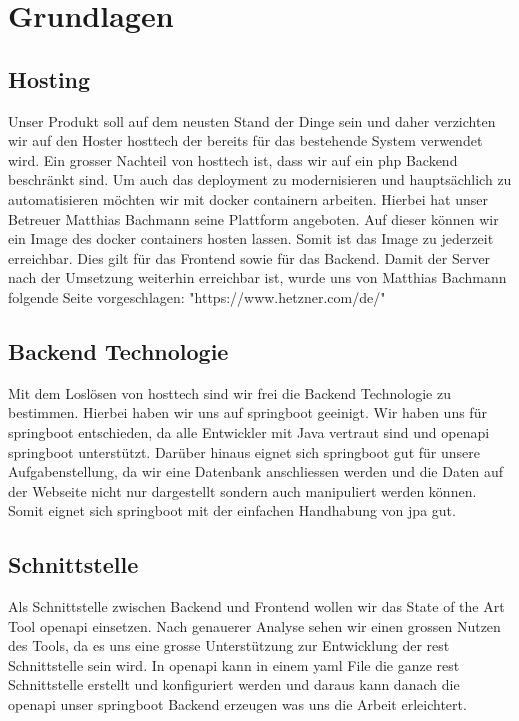 \documentclass[../main.tex]{subfiles}
\begin{document}
	\section{Grundlagen}
	
	\subsection{Hosting}
	Unser Produkt soll auf dem neusten Stand der Dinge sein und daher verzichten wir auf den Hoster \gls{hosttech} der bereits für das bestehende System verwendet wird. Ein grosser Nachteil von \gls{hosttech} ist, dass wir auf ein \gls{php} Backend beschränkt sind. Um auch das \gls{deployment} zu modernisieren und hauptsächlich zu automatisieren möchten wir mit \gls{docker} \gls{container}n arbeiten. Hierbei hat unser Betreuer Matthias Bachmann seine Plattform angeboten. Auf dieser können wir ein Image des \gls{docker} \gls{container}s hosten lassen. Somit ist das Image zu jederzeit erreichbar. Dies gilt für das Frontend sowie für das Backend.
	Damit der Server nach der Umsetzung weiterhin erreichbar ist, wurde uns von Matthias Bachmann folgende Seite vorgeschlagen: "https://www.hetzner.com/de/"
	
	\subsection{Backend Technologie}
	Mit dem Loslösen von \gls{hosttech} sind wir frei die Backend Technologie zu bestimmen. Hierbei haben wir uns auf \gls{springboot} geeinigt. Wir haben uns für \gls{springboot} entschieden, da alle Entwickler mit Java vertraut sind und \gls{openapi} \gls{springboot} unterstützt. Darüber hinaus eignet sich \gls{springboot} gut für unsere Aufgabenstellung, da wir eine Datenbank anschliessen werden und die Daten auf der Webseite nicht nur dargestellt  sondern auch manipuliert werden können. Somit eignet sich \gls{springboot} mit der einfachen Handhabung von \gls{jpa} gut.
	
	\subsection{Schnittstelle}
	Als Schnittstelle zwischen Backend und Frontend wollen wir das State of the Art Tool \gls{openapi} einsetzen. Nach genauerer Analyse sehen wir einen grossen Nutzen des Tools, da es uns eine grosse Unterstützung zur Entwicklung der \gls{rest} Schnittstelle sein wird. In \gls{openapi} kann in einem \gls{yaml} File die ganze \gls{rest} Schnittstelle erstellt und konfiguriert werden und daraus kann danach die \gls{openapi} unser \gls{springboot} Backend erzeugen was uns die Arbeit erleichtert.
	
\end{document}
